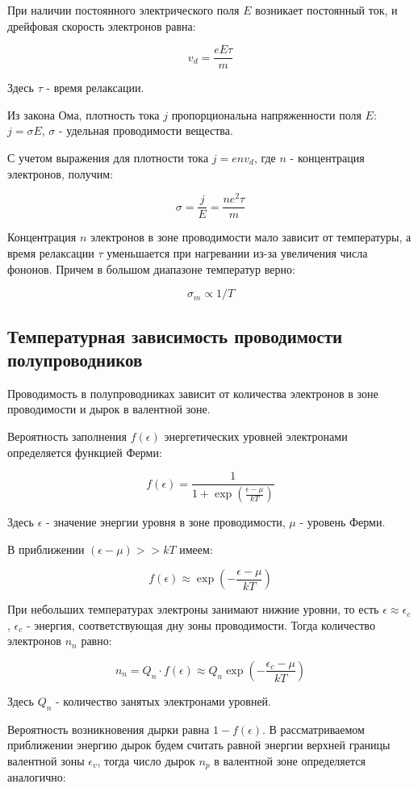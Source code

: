 \documentclass[12pt]{kiarticle}
\begin{document}
	При наличии постоянного электрического поля $E$ возникает постоянный ток, и дрейфовая скорость электронов равна: 
	
	\[ v_d = \frac{eE\tau}{m} \]
	
	Здесь $\tau$ - время релаксации. 
	
	Из закона Ома, плотность тока $j$ пропорциональна напряженности поля $E$: $j = \sigma E$, $\sigma$ - удельная проводимости вещества. 
	
	С учетом выражения для плотности тока $j = env_d$, где $n$ - концентрация электронов, получим: 
	
	\[ \sigma = \frac{j}{E} = \frac{ne^2\tau}{m} \]
	
	Концентрация $n$ электронов в зоне проводимости мало зависит от температуры, а время релаксации $\tau$ уменьшается при нагревании из-за увеличения числа фононов. Причем в большом диапазоне температур верно: 
	
	\[ \sigma_m \propto 1/T \]
	
	\subsection{Температурная зависимость проводимости полупроводников}
	
	Проводимость в полупроводниках зависит от количества электронов в зоне проводимости и дырок в валентной зоне. 
	
	Вероятность заполнения $f(\epsilon)$ энергетических уровней электронами определяется функцией Ферми: 
	
	\[ f(\epsilon) = \frac{1}{1 + \exp\left(\frac{\epsilon - \mu}{kT}\right)} \]
	
	Здесь $\epsilon$ - значение энергии уровня в зоне проводимости, $\mu$ - уровень Ферми. 
	
	В приближении $(\epsilon - \mu) >> kT$ имеем: 
	
	\[ f(\epsilon) \approx \exp\left(-\frac{\epsilon - \mu}{kT}\right) \] 
	
	При небольших температурах электроны занимают нижние уровни, то есть $\epsilon \approx \epsilon_c$, $\epsilon_c$ - энергия, соответствующая дну зоны проводимости. Тогда количество электронов $n_n$ равно: 
	
	\[ n_n = Q_n\cdot f(\epsilon) \approx Q_n\exp\left(-\frac{\epsilon_c - \mu}{kT}\right) \]
	
	Здесь $Q_n$ - количество занятых электронами уровней.
	
	Вероятность возникновения дырки равна $1 - f(\epsilon)$. В рассматриваемом приближении энергию дырок будем считать равной энергии верхней границы валентной зоны $\epsilon_v$, тогда число дырок $n_p$ в валентной зоне определяется аналогично: 
	
\end{document}
